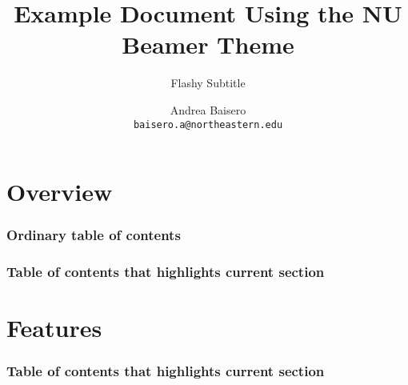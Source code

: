 \documentclass[9pt]{beamer}
\title{Example Document Using the NU Beamer Theme}
\subtitle{Flashy Subtitle}
\author[A. Baisero]{Andrea Baisero\\\texttt{baisero.a@northeastern.edu}}
\institute{Northeastern University, Boston, USA}
\begin{document}
\section{Overview}

%
%
\begin{frame}
  \frametitle{Ordinary table of contents}

  \tableofcontents

\end{frame}

\begin{frame}
  \frametitle{Table of contents that highlights current section}

  \tableofcontents[currentsection]

\end{frame}

\section{Features}

\begin{frame}
  \frametitle{Table of contents that highlights current section}

  \tableofcontents[currentsection]

\end{frame}

\hidelogo
\end{document}
